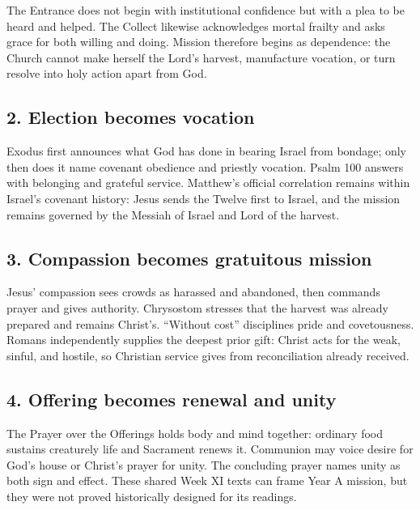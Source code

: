 \begin{deepstudy}
The Entrance does not begin with institutional confidence but with a plea to be heard and helped. The Collect likewise acknowledges mortal frailty and asks grace for both willing and doing. Mission therefore begins as dependence: the Church cannot make herself the Lord's harvest, manufacture vocation, or turn resolve into holy action apart from God.

\subsection*{2. Election becomes vocation\enspace{}}

Exodus first announces what God has done in bearing Israel from bondage; only then does it name covenant obedience and priestly vocation. Psalm 100 answers with belonging and grateful service. Matthew's official correlation remains within Israel's covenant history: Jesus sends the Twelve first to Israel, and the mission remains governed by the Messiah of Israel and Lord of the harvest.

\subsection*{3. Compassion becomes gratuitous mission\enspace{}}

Jesus' compassion sees crowds as harassed and abandoned, then commands prayer and gives authority. Chrysostom stresses that the harvest was already prepared and remains Christ's. “Without cost” disciplines pride and covetousness. Romans independently supplies the deepest prior gift: Christ acts for the weak, sinful, and hostile, so Christian service gives from reconciliation already received.

\subsection*{4. Offering becomes renewal and unity\enspace{}}

The Prayer over the Offerings holds body and mind together: ordinary food sustains creaturely life and Sacrament renews it. Communion may voice desire for God's house or Christ's prayer for unity. The concluding prayer names unity as both sign and effect. These shared Week XI texts can frame Year A mission, but they were not proved historically designed for its readings.


\end{deepstudy}
